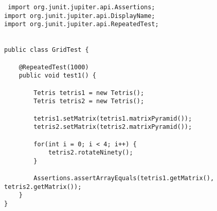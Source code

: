 \documentclass[a4paper,12pt,titlepage]{article}
\theoremstyle{definition}
\theoremstyle{remark}
\begin{document}
\begin{lstlisting}
 import org.junit.jupiter.api.Assertions;
import org.junit.jupiter.api.DisplayName;
import org.junit.jupiter.api.RepeatedTest;


public class GridTest {

    @RepeatedTest(1000)
    public void test1() {

        Tetris tetris1 = new Tetris();
        Tetris tetris2 = new Tetris();

        tetris1.setMatrix(tetris1.matrixPyramid());
        tetris2.setMatrix(tetris2.matrixPyramid());

        for(int i = 0; i < 4; i++) {
            tetris2.rotateNinety();
        }

        Assertions.assertArrayEquals(tetris1.getMatrix(), tetris2.getMatrix());
    }
}

\end{lstlisting}
\end{document}
